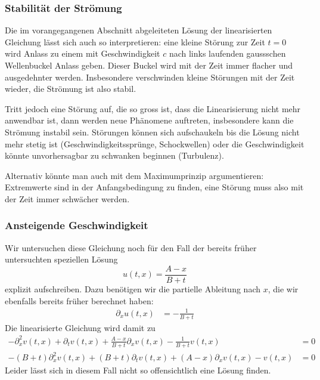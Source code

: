\subsubsection{Stabilität der Strömung}
Die im vorangegangenen Abschnitt abgeleiteten Lösung der linearisierten
Gleichung lässt sich auch so interpretieren: eine kleine Störung zur Zeit
$t=0$ wird Anlass zu einem mit Geschwindigkeit $c$ nach links
laufenden gaussschen Wellenbuckel Anlass geben. Dieser Buckel wird mit
der Zeit immer flacher und ausgedehnter werden. Insbesondere verschwinden
kleine Störungen mit der Zeit wieder, die Strömung ist also stabil.

Tritt jedoch eine Störung auf, die so gross ist, dass die Linearisierung
nicht mehr anwendbar ist, dann werden neue Phänomene auftreten, insbesondere kann
die Strömung instabil sein. Störungen können sich aufschaukeln bis die
Lösung nicht mehr stetig ist (Geschwindigkeitssprünge, Schockwellen)
oder die Geschwindigkeit könnte unvorhersagbar zu schwanken beginnen
(Turbulenz).

Alternativ könnte man auch mit dem Maximumprinzip argumentieren: Extremwerte
sind in der Anfangsbedingung zu finden, eine Störung muss also mit der
Zeit immer schwächer werden.

\subsubsection{Ansteigende Geschwindigkeit}
Wir untersuchen diese Gleichung noch für den Fall der bereits 
früher untersuchten speziellen Lösung 
\[
u(t,x)=\frac{A-x}{B+t}
\]
explizit aufschreiben. Dazu benötigen wir die partielle Ableitung
nach $x$, die wir ebenfalls bereits früher berechnet haben:
\begin{align*}
\partial_x u(t,x)&=-\frac{1}{B+t}
\end{align*}
Die linearisierte Gleichung wird damit zu
\begin{align*}
-\partial_x^2v(t,x)
+\partial_tv(t,x)
+ \frac{A-x}{B+t}\partial_xv(t,x)
-\frac{1}{B+t} v(t,x)
&=0
\\
-(B+t)\partial_x^2v(t,x)
+(B+t)\partial_tv(t,x)
+ (A-x)\partial_xv(t,x)
- v(t,x)
&=0
\end{align*}
Leider lässt sich in diesem Fall nicht so offensichtlich eine Lösung finden.

